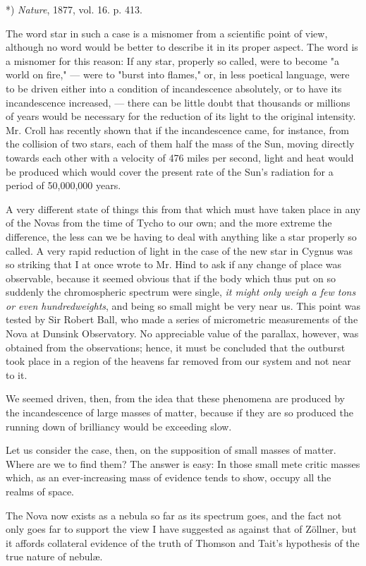 \documentclass[a4paper, 12pt, oneside, polutonikogreek, english]{article}
\begin{document}
*) \emph{Nature}, 1877, vol. 16. p. 413.

The word star in such a case is a misnomer from a scientific point of view, although no word would be better to describe it in its proper aspect. The word is a misnomer for this reason: If any star, properly so called, were to become "a world on fire," --- were to "burst into flames," or, in less poetical language, were to be driven either into a condition of incandescence absolutely, or to have its incandescence increased, --- there can be little doubt that thousands or millions of years would be necessary for the reduction of its light to the original intensity. Mr. Croll has recently shown that if the incandescence came, for instance, from the collision of two stars, each of them half the mass of the Sun, moving directly towards each other with a velocity of 476 miles per second, light and heat would be produced which would cover the present rate of the Sun's radiation for a period of 50,000,000 years.

A very different state of things this from that which must have taken place in any of the Novas from the time of Tycho to our own; and the more extreme the difference, the less can we be having to deal with anything like a star properly so called. A very rapid reduction of light in the case of the new star in Cygnus was so striking that I at once wrote to Mr. Hind to ask if any change of place was observable, because it seemed obvious that if the body which thus put on so suddenly the chromospheric spectrum were single, \emph{it might only weigh a few tons or even hundredweights}, and being so small might be very near us. This point was tested by Sir Robert Ball, who made a series of micrometric measurements of the Nova at Dunsink Observatory. No appreciable value of the parallax, however, was obtained from the observations; hence, it must be concluded that the outburst took place in a region of the heavens far removed from our system and not near to it.

We seemed driven, then, from the idea that these phenomena are produced by the incandescence of large masses of matter, because if they are so produced the running down of brilliancy would be exceeding slow.

Let us consider the case, then, on the supposition of small masses of matter. Where are we to find them? The answer is easy: In those small mete critic masses which, as an ever-increasing mass of evidence tends to show, occupy all the realms of space.

The Nova now exists as a nebula so far as its spectrum goes, and the fact not only goes far to support the view I have suggested as against that of Zöllner, but it affords collateral evidence of the truth of Thomson and Tait's hypothesis of the true nature of nebulæ.
\end{document}
